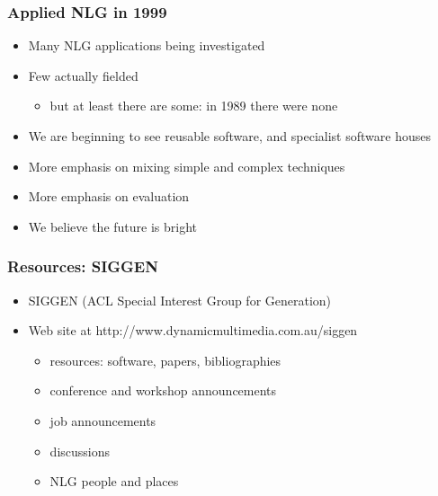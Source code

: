 \documentclass[compress,color=usenames]{beamer}
\begin{document}
\begin{frame}
\frametitle{
Applied NLG in 1999}

\label{f99}
\begin{itemize}
\item {{Many NLG applications being investigated }}
\item {{Few actually fielded}}
\begin{itemize}
\item but at least there are some: in 1989 there were none
\end{itemize}
\item {{We are beginning to see reusable software, and specialist software houses}}
\item {{More emphasis on mixing simple and complex techniques}}
\item {{More emphasis on evaluation}}
\item {{We believe the future is bright}}
\end{itemize}
 
\end{frame}

\begin{frame}
\frametitle{
Resources: SIGGEN}

\label{f101}
\begin{itemize}
\item {{SIGGEN (ACL Special Interest Group for Generation)}}
\item {{Web site at  
http://www.dynamicmultimedia.com.au/siggen}}
\begin{itemize}
\item resources: software, papers, bibliographies
\item conference and workshop announcements
\item job announcements
\item discussions
\item NLG people and places
\end{itemize}
\end{itemize}
 
\end{frame}
\end{document}
